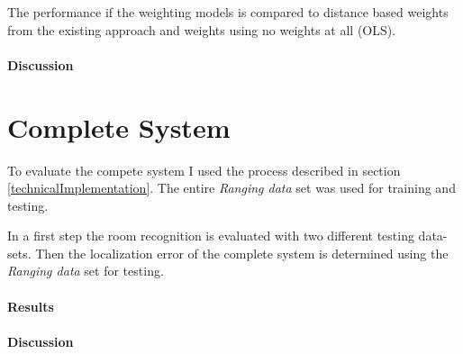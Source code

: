 The performance if the weighting models is compared to distance based weights from the existing approach and weights using no weights at all (OLS).

\paragraph{Discussion}

\section{Complete System}

To evaluate the compete system I used the process described in section \ref{technicalImplementation}. The entire \emph{Ranging data} set was used for training and testing.

In a first step the room recognition is evaluated with two different testing data-sets. Then the localization error of the complete system is determined using the \emph{Ranging data} set for testing.

\paragraph{Results}


\paragraph{Discussion}


